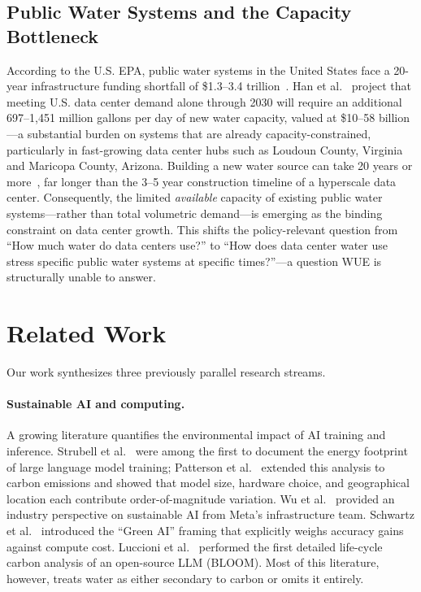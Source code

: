 \documentclass[conference,10pt]{IEEEtran}
\begin{document}
\subsection{Public Water Systems and the Capacity Bottleneck}

According to the U.S. EPA, public water systems in the United States
face a 20-year infrastructure funding shortfall of \$1.3--3.4
trillion~\cite{epa2024watercongress}. Han et al.~\cite{han2026} project
that meeting U.S. data center demand alone through 2030 will require an
additional 697--1{,}451 million gallons per day of new water capacity,
valued at \$10--58 billion---a substantial burden on systems that are
already capacity-constrained, particularly in fast-growing data center
hubs such as Loudoun County, Virginia and Maricopa County, Arizona.
Building a new water source can take 20 years or
more~\cite{han2026}, far longer than the 3--5 year construction timeline
of a hyperscale data center. Consequently, the limited \emph{available}
capacity of existing public water systems---rather than total volumetric
demand---is emerging as the binding constraint on data center growth.
This shifts the policy-relevant question from ``How much water do data
centers use?'' to ``How does data center water use stress specific
public water systems at specific times?''---a question WUE is
structurally unable to answer.

\section{Related Work}
\label{sec:related}

Our work synthesizes three previously parallel research streams.

\paragraph{Sustainable AI and computing.}
A growing literature quantifies the environmental impact of AI training
and inference. Strubell et al.~\cite{strubell2019energy} were among the
first to document the energy footprint of large language model training;
Patterson et al.~\cite{patterson2022carbon} extended this analysis to
carbon emissions and showed that model size, hardware choice, and
geographical location each contribute order-of-magnitude variation. Wu
et al.~\cite{wu2022sustainable} provided an industry perspective on
sustainable AI from Meta's infrastructure team. Schwartz et
al.~\cite{schwartz2020green} introduced the ``Green AI'' framing that
explicitly weighs accuracy gains against compute cost. Luccioni et
al.~\cite{luccioni2023bloom} performed the first detailed life-cycle
carbon analysis of an open-source LLM (BLOOM). Most of this literature,
however, treats water as either secondary to carbon or omits it
entirely.
\end{document}
